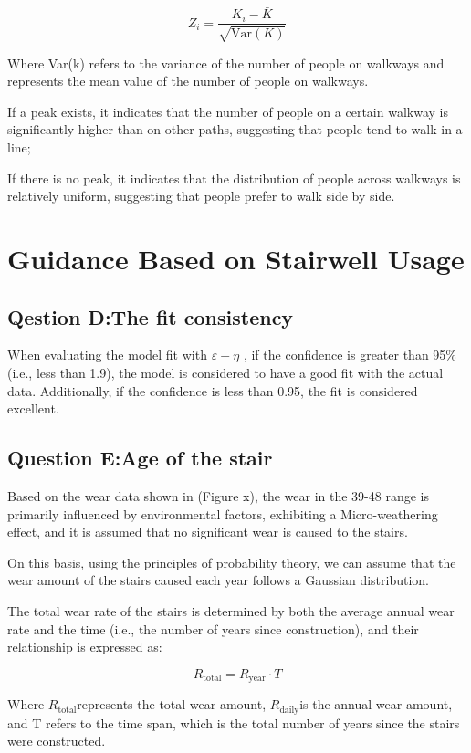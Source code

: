 \documentclass{mcmthesis}
\begin{document}
\[ Z_i = \frac{K_i - \bar{K}}{\sqrt{\text{Var}(K)}} \]

Where Var(k) refers to the variance of the number of people on walkways and represents the mean value of the number of people on walkways.



If a peak exists, it indicates that the number of people on a certain walkway is significantly higher than on other paths, suggesting that people tend to walk in a line;

If there is no peak, it indicates that the distribution of people across walkways is relatively uniform, suggesting that people prefer to walk side by side.

\section{Guidance Based on Stairwell Usage}
\subsection{Qestion D:The fit consistency}
When evaluating the model fit with $\varepsilon +\eta$ , if the confidence is greater than 95\% (i.e., less than 1.9), the model is considered to have a good fit with the actual data. Additionally, if the confidence is less than 0.95, the fit is considered excellent.
\subsection{Question E:Age of the stair }

Based on the wear data shown in (Figure x), the wear in the 39-48 range is primarily influenced by environmental factors, exhibiting a Micro-weathering effect, and it is assumed that no significant wear is caused to the stairs.

On this basis, using the principles of probability theory, we can assume that the wear amount of the stairs caused each year follows a Gaussian distribution.

The total wear rate of the stairs is determined by both the average annual wear rate and the time (i.e., the number of years since construction), and their relationship is expressed as:

\[R_{\text{total}} = R_{\text{year}} \cdot T \]

Where $R_{\text{total}}$​ represents the total wear amount, $R_{\text{daily}}$​ is the annual wear amount, and T refers to the time span, which is the total number of years since the stairs were constructed.
\end{document}
